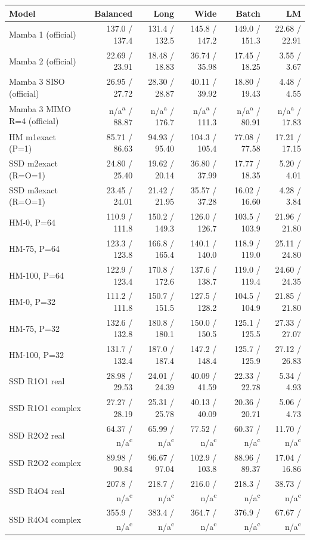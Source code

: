 \begin{tabular}{@{}lrrrrr@{}}
\toprule
Model & Balanced & Long & Wide & Batch & LM \\
\midrule
Mamba 1 (official) & 137.0 / 137.4 & 131.4 / 132.5 & 145.8 / 147.2 & 149.0 / 151.3 & 22.68 / 22.91 \\
Mamba 2 (official) & 22.69 / 23.91 & 18.48 / 18.83 & 36.74 / 35.98 & 17.45 / 18.25 & 3.55 / 3.67 \\
Mamba 3 SISO (official) & 26.95 / 27.72 & 28.30 / 28.87 & 40.11 / 39.92 & 18.80 / 19.43 & 4.48 / 4.55 \\
Mamba 3 MIMO R=4 (official) & n/a\textsuperscript{a} / 88.87 & n/a\textsuperscript{a} / 176.7 & n/a\textsuperscript{a} / 111.3 & n/a\textsuperscript{a} / 80.91 & n/a\textsuperscript{a} / 17.83 \\
HM m1exact (P=1) & 85.71 / 86.63 & 94.93 / 95.40 & 104.3 / 105.4 & 77.08 / 77.58 & 17.21 / 17.15 \\
SSD m2exact (R=O=1) & 24.80 / 25.40 & 19.62 / 20.14 & 36.80 / 37.99 & 17.77 / 18.35 & 5.20 / 4.01 \\
SSD m3exact (R=O=1) & 23.45 / 24.01 & 21.42 / 21.95 & 35.57 / 37.28 & 16.02 / 16.60 & 4.28 / 3.84 \\
HM-0, P=64 & 110.9 / 111.8 & 150.2 / 149.3 & 126.0 / 126.7 & 103.5 / 103.9 & 21.96 / 21.80 \\
HM-75, P=64 & 123.3 / 123.8 & 166.8 / 165.4 & 140.1 / 140.0 & 118.9 / 119.0 & 25.11 / 24.80 \\
HM-100, P=64 & 122.9 / 123.4 & 170.8 / 172.6 & 137.6 / 138.7 & 119.0 / 119.4 & 24.60 / 24.35 \\
HM-0, P=32 & 111.2 / 111.8 & 150.7 / 151.5 & 127.5 / 128.2 & 104.5 / 104.9 & 21.85 / 21.80 \\
HM-75, P=32 & 132.6 / 132.8 & 180.8 / 180.1 & 150.0 / 150.5 & 125.1 / 125.5 & 27.33 / 27.07 \\
HM-100, P=32 & 131.7 / 132.4 & 187.0 / 187.4 & 147.2 / 148.4 & 125.7 / 125.9 & 27.12 / 26.83 \\
SSD R1O1 real & 28.98 / 29.53 & 24.01 / 24.39 & 40.09 / 41.59 & 22.33 / 22.78 & 5.34 / 4.93 \\
SSD R1O1 complex & 27.27 / 28.19 & 25.31 / 25.78 & 40.13 / 40.09 & 20.36 / 20.71 & 5.06 / 4.73 \\
SSD R2O2 real & 64.37 / n/a\textsuperscript{c} & 65.99 / n/a\textsuperscript{c} & 77.52 / n/a\textsuperscript{c} & 60.37 / n/a\textsuperscript{c} & 11.70 / n/a\textsuperscript{c} \\
SSD R2O2 complex & 89.98 / 90.84 & 96.67 / 97.04 & 102.9 / 103.8 & 88.96 / 89.37 & 17.04 / 16.86 \\
SSD R4O4 real & 207.8 / n/a\textsuperscript{c} & 218.7 / n/a\textsuperscript{c} & 216.0 / n/a\textsuperscript{c} & 218.3 / n/a\textsuperscript{c} & 38.73 / n/a\textsuperscript{c} \\
SSD R4O4 complex & 355.9 / n/a\textsuperscript{c} & 383.4 / n/a\textsuperscript{c} & 364.7 / n/a\textsuperscript{c} & 376.9 / n/a\textsuperscript{c} & 67.67 / n/a\textsuperscript{c} \\
\bottomrule
\end{tabular}
